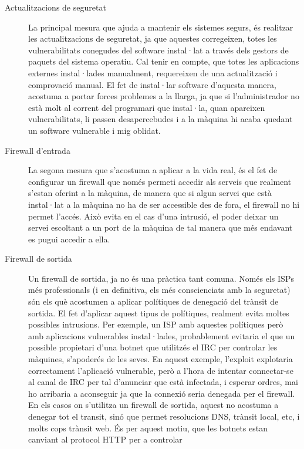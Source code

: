 \begin{description}
    \item[Actualitzacions de seguretat] La principal mesura que ajuda a mantenir els sistemes segurs, és
        realitzar les actualitzacions de seguretat, ja que aquestes corregeixen, totes les vulnerabilitats
        conegudes del software instal·lat a través dels gestors de paquets del sistema operatiu. Cal tenir 
        en compte, que totes les aplicacions externes instal·lades manualment, requereixen de una actualització i 
        comprovació manual. El fet de instal·lar software d'aquesta manera, acostuma a portar forces problemes 
        a la llarga, ja que si l'administrador no està molt al corrent del programari que instal·la,
        quan apareixen vulnerabilitats, li passen desapercebudes i a la màquina hi acaba quedant un software 
        vulnerable i mig oblidat.
    \item[Firewall d'entrada] La segona mesura que s'acostuma a aplicar a la vida real, és el fet de configurar
        un firewall que només permeti accedir als serveis que realment s'estan oferint a la màquina, de manera
        que si algun servei que està instal·lat a la màquina no ha de ser accessible des de fora, el firewall
        no hi permet l'accés. Això evita en el cas d'una intrusió, el poder deixar un servei escoltant a un port
        de la màquina de tal manera que més endavant es pugui accedir a ella.
    \item[Firewall de sortida] Un firewall de sortida, ja no és una pràctica tant comuna. Només els ISPs més 
        professionals (i en definitiva, els més conscienciats amb la seguretat) són els què acostumen a aplicar 
        polítiques de denegació del trànsit de sortida. El fet d'aplicar aquest tipus de polítiques, realment
        evita moltes possibles intrusions. Per exemple, un ISP amb aquestes polítiques però amb aplicacions 
        vulnerables instal·lades, probablement evitaria el que un possible propietari d'una botnet que utilitzés
        el IRC per controlar les màquines, s'apoderés de les seves. En aquest exemple, l'exploit explotaria 
        correctament l'aplicació vulnerable, però a l'hora de intentar connectar-se al canal de IRC per tal
        d'anunciar que està infectada, i esperar ordres, mai ho arribaria a aconseguir ja que la connexió 
        seria denegada per el firewall. En els casos on s'utilitza un firewall de sortida, aquest no acostuma
        a denegar tot el transit, sinó que permet resolucions DNS, trànsit local, etc, i molts cops trànsit web. 
        És per aquest motiu, que les botnets estan canviant al protocol HTTP per a controlar 

\end{description}
